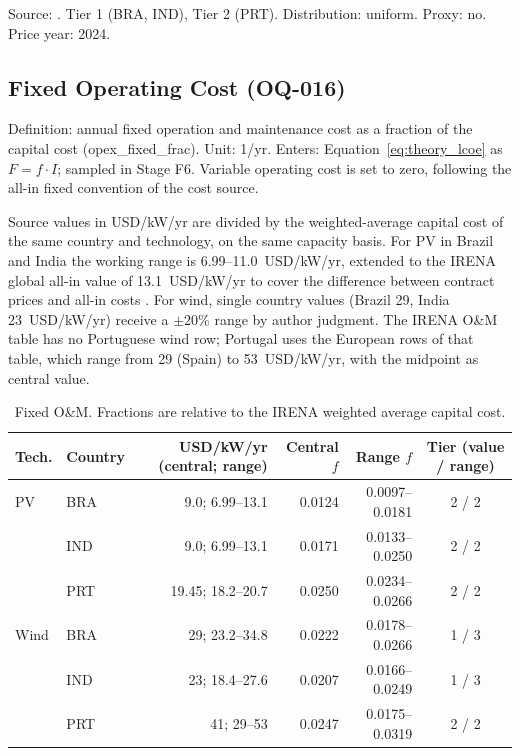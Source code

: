 Source: \cite{irena2025costs2024}. Tier 1 (BRA, IND), Tier 2 (PRT).
Distribution: uniform. Proxy: no. Price year: 2024.

\subsection{Fixed Operating Cost (OQ-016)}
\label{subsec:g2_opex}

Definition: annual fixed operation and maintenance cost as a fraction of
the capital cost (opex\_fixed\_frac). Unit: 1/yr. Enters:
Equation~\ref{eq:theory_lcoe} as $F=f\cdot I$; sampled in Stage F6.
Variable operating cost is set to zero, following the all-in fixed
convention of the cost source.

Source values in USD/kW/yr are divided by the weighted-average capital
cost of the same country and technology, on the same capacity basis. For
PV in Brazil and India the working range is 6.99--11.0~USD/kW/yr,
extended to the IRENA global all-in value of 13.1~USD/kW/yr to cover the
difference between contract prices and all-in costs
\cite{irena2025costs2024}. For wind, single country values (Brazil 29,
India 23~USD/kW/yr) receive a $\pm20\%$ range by author judgment. The
IRENA O\&M table has no Portuguese wind row; Portugal uses the European
rows of that table, which range from 29 (Spain) to 53~USD/kW/yr, with the
midpoint as central value.

\begin{table}[htbp]
    \centering
    \caption{Fixed O\&M. Fractions are relative to the IRENA weighted
    average capital cost.}
    \label{tab:g2_opex}
    \small
    \begin{tabular}{llrrrc}
        \toprule
        Tech. & Country & USD/kW/yr (central; range) & Central $f$ & Range $f$ & Tier (value / range) \\
        \midrule
        PV   & BRA & 9.0; 6.99--13.1  & 0.0124 & 0.0097--0.0181 & 2 / 2 \\
             & IND & 9.0; 6.99--13.1  & 0.0171 & 0.0133--0.0250 & 2 / 2 \\
             & PRT & 19.45; 18.2--20.7 & 0.0250 & 0.0234--0.0266 & 2 / 2 \\
        Wind & BRA & 29; 23.2--34.8   & 0.0222 & 0.0178--0.0266 & 1 / 3 \\
             & IND & 23; 18.4--27.6   & 0.0207 & 0.0166--0.0249 & 1 / 3 \\
             & PRT & 41; 29--53       & 0.0247 & 0.0175--0.0319 & 2 / 2 \\
        \bottomrule
    \end{tabular}
\end{table}

